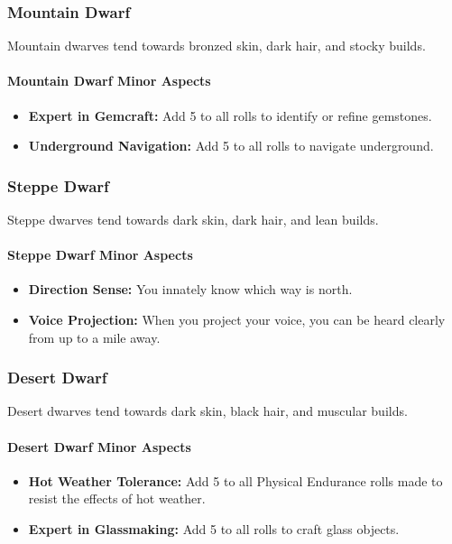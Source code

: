 \begin{multicols}{2}
\subsubsection{Mountain Dwarf}

Mountain dwarves tend towards bronzed skin, dark hair, and stocky builds.

\paragraph{Mountain Dwarf Minor Aspects}

\begin{itemize}
    \item \textbf{Expert in Gemcraft:} Add 5 to all rolls to identify or refine gemstones.
    \item \textbf{Underground Navigation:} Add 5 to all rolls to navigate underground.
\end{itemize}

\subsubsection{Steppe Dwarf}

Steppe dwarves tend towards dark skin, dark hair, and lean builds.

\paragraph{Steppe Dwarf Minor Aspects}

\begin{itemize}
    \item \textbf{Direction Sense:} You innately know which way is north.
    \item \textbf{Voice Projection:} When you project your voice, you can be heard clearly from up to a mile away.
\end{itemize}

\subsubsection{Desert Dwarf}

Desert dwarves tend towards dark skin, black hair, and muscular builds.

\paragraph{Desert Dwarf Minor Aspects}

\begin{itemize}
    \item \textbf{Hot Weather Tolerance:} Add 5 to all Physical Endurance rolls made to resist the effects of hot weather.
    \item \textbf{Expert in Glassmaking:} Add 5 to all rolls to craft glass objects.
\end{itemize}


\end{multicols}
